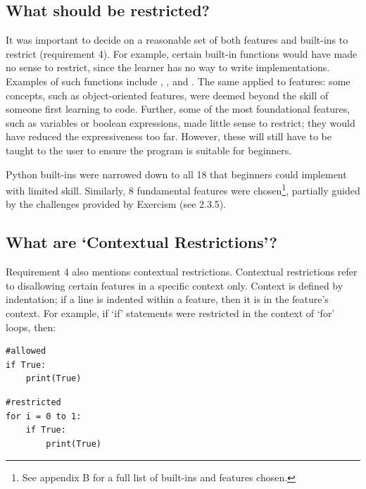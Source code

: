 \subsection{What should be restricted?}

It was important to decide on a reasonable set of both features and built-ins to restrict (requirement 4). For example, certain built-in functions would have made no sense to restrict, since the learner has no way to write implementations. Examples of such functions include , , and . The same applied to features: some concepts, such as object-oriented features, were deemed beyond the skill of someone first learning to code. Further, some of the most foundational features, such as variables or boolean expressions, made little sense to restrict; they would have reduced the expressiveness too far. However, these will still have to be taught to the user to ensure the program is suitable for beginners.

Python built-ins were narrowed down to all 18 that beginners could implement with limited skill. Similarly, 8 fundamental features were chosen\footnote{See appendix B for a full list of built-ins and features chosen.}, partially guided by the challenges provided by Exercism (see 2.3.5).

\subsection{What are `Contextual Restrictions'?}

Requirement 4 also mentions contextual restrictions. Contextual restrictions refer to disallowing certain features in a specific context only. Context is defined by indentation; if a line is indented within a feature, then it is in the feature's context. For example, if `if' statements were restricted in the context of `for' loops, then:

\begin{minipage}[t]{0.48\textwidth}
    \begin{lstlisting}
#allowed
if True:
    print(True)
    \end{lstlisting}
\end{minipage}
\hfill
\begin{minipage}[t]{0.48\textwidth}
    \begin{lstlisting}
#restricted
for i = 0 to 1:
    if True:
        print(True)
    \end{lstlisting}
\end{minipage}

